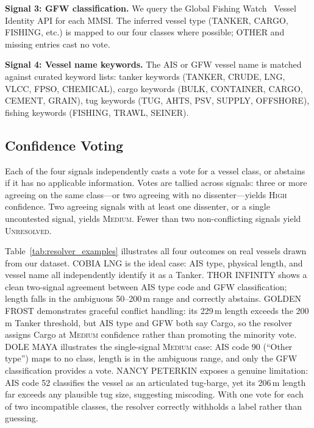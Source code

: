 \documentclass[journal]{IEEEtran}
\begin{document}
\textbf{Signal 3: GFW classification.}
We query the Global Fishing Watch~\cite{kroodsma2018} Vessel Identity API
for each MMSI.
The inferred vessel type (TANKER, CARGO, FISHING, etc.) is mapped to
our four classes where possible; OTHER and missing entries cast no vote.

\textbf{Signal 4: Vessel name keywords.}
The AIS or GFW vessel name is matched against curated keyword lists:
tanker keywords (TANKER, CRUDE, LNG, VLCC, FPSO, CHEMICAL),
cargo keywords (BULK, CONTAINER, CARGO, CEMENT, GRAIN),
tug keywords (TUG, AHTS, PSV, SUPPLY, OFFSHORE),
fishing keywords (FISHING, TRAWL, SEINER).

\subsection{Confidence Voting}

Each of the four signals independently casts a vote for a vessel class,
or abstains if it has no applicable information.
Votes are tallied across signals: three or more agreeing on the same
class---or two agreeing with no dissenter---yields \textsc{High} confidence.
Two agreeing signals with at least one dissenter, or a single uncontested
signal, yields \textsc{Medium}.
Fewer than two non-conflicting signals yield \textsc{Unresolved}.

Table~\ref{tab:resolver_examples} illustrates all four outcomes on real
vessels drawn from our dataset.
COBIA LNG is the ideal case: AIS type, physical length, and vessel name
all independently identify it as a Tanker.
THOR INFINITY shows a clean two-signal agreement between AIS type code
and GFW classification; length falls in the ambiguous 50--200\,m range
and correctly abstains.
GOLDEN FROST demonstrates graceful conflict handling: its 229\,m length
exceeds the 200\,m Tanker threshold, but AIS type and GFW both say Cargo,
so the resolver assigns Cargo at \textsc{Medium} confidence rather than
promoting the minority vote.
DOLE MAYA illustrates the single-signal \textsc{Medium} case: AIS code 90
(``Other type'') maps to no class, length is in the ambiguous range, and
only the GFW classification provides a vote.
NANCY PETERKIN exposes a genuine limitation: AIS code 52 classifies the
vessel as an articulated tug-barge, yet its 206\,m length far exceeds
any plausible tug size, suggesting miscoding.
With one vote for each of two incompatible classes, the resolver
correctly withholds a label rather than guessing.
\end{document}
